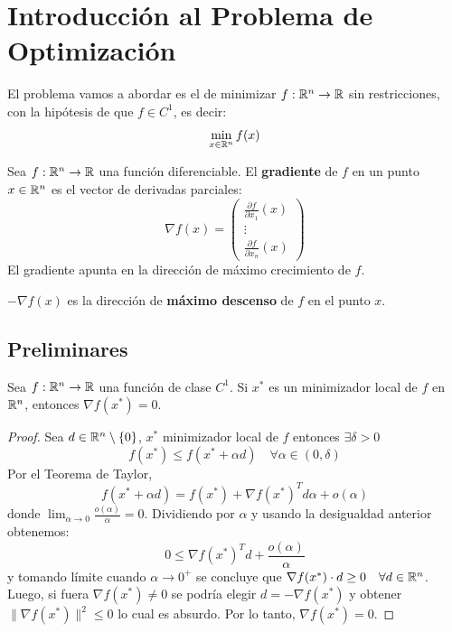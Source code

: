 \section{Introducción al Problema de Optimización}

El problema vamos a abordar es el de minimizar \( f: \mathbb{R}^n \to \mathbb{R} \) sin restricciones, con la hipótesis de que \( f \in C^1 \), es decir:
\[
    \min_{x \in \mathbb{R}^n} f(x)
\]

\begin{definition}[Gradiente]
    Sea \( f: \mathbb{R}^n \to \mathbb{R} \) una función diferenciable. El \textbf{gradiente} de \(f\) en un punto \(x \in \mathbb{R}^n\) es el vector de derivadas parciales:
    \[
        \nabla f(x) = \begin{pmatrix} \frac{\partial f}{\partial x_1}(x) \\ \vdots \\ \frac{\partial f}{\partial x_n}(x) \end{pmatrix}
    \]
    El gradiente apunta en la dirección de máximo crecimiento de \( f \).
\end{definition}

\begin{note}
    \( -\nabla f(x) \) es la dirección de \textbf{máximo descenso} de \( f \) en el punto \( x \).
\end{note}

\subsection{Preliminares}

\begin{theorem}
    Sea \( f : \mathbb{R}^n \to \mathbb{R} \) una función de clase \( C^1 \). Si \( x^* \) es un minimizador local de \( f \) en \( \mathbb{R}^n \), entonces \( \nabla f(x^*) = 0 \).
    \begin{proof}
        Sea \( d \in \mathbb{R}^n \setminus \{ 0 \} \), \( x^* \) minimizador local de \( f \) entonces \( \exists \delta > 0 \)
        \[
            f(x^*) \leq f(x^* + \alpha d) \quad \forall \alpha \in (0, \delta)
        \]
        Por el Teorema de Taylor,
        \[
            f(x^* + \alpha d) = f(x^*) + {\nabla f(x^*)}^T d \alpha + o(\alpha)
        \]
        donde \( \lim_{\alpha \to 0} \frac{o(\alpha)}{\alpha} = 0 \). Dividiendo por \( \alpha \) y usando la desigualdad anterior obtenemos:
        \[
            0 \leq {\nabla f(x^*)}^T d + \frac{o(\alpha)}{\alpha}
        \]
        y tomando límite cuando \( \alpha \to 0^+ \) se concluye que \( \nabla f(x^*) \cdot d \geq 0 \quad \forall d \in \mathbb{R}^n \). Luego, si fuera \( \nabla f(x^*) \neq 0 \) se podría elegir \( d = - \nabla f(x^*) \) 
        y obtener \( \| \nabla f(x^*) \|^2 \leq 0 \) lo cual es absurdo. Por lo tanto, \( \nabla f(x^*) = 0 \).
    \end{proof}
\end{theorem}

